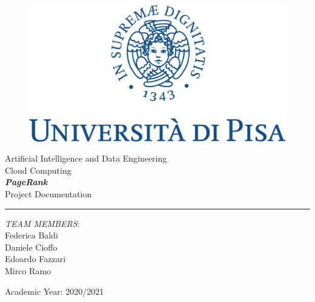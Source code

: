 \documentclass[11pt]{article}
\begin{document}
\begin{titlepage}
    \begin{center}
        \begin{figure}
            \includegraphics[width=\textwidth]{img/marchio_unipi_pant541-eps-converted-to.pdf}         
        \end{figure}
        {\Large
        Artificial Intelligence and Data Engineering\\
        \vspace{5mm} %
        Cloud Computing}\\
        \vspace{30mm} %
        {\Huge\textbf{\textit{PageRank}}}\\
        \vspace{10mm} %
        {\Large Project Documentation}\\
        \par\noindent\rule{\textwidth}{0.4pt}
            \begin{flushright}
                \textit{TEAM MEMBERS}:\\
                Federica Baldi\\
                Daniele Cioffo\\
                Edoardo Fazzari\\ 
                Mirco Ramo\\
        	
            \end{flushright}
            \vfill
        Academic Year: 2020/2021\\        
    \end{center}
\end{titlepage} 
   
\tableofcontents



\end{document}
